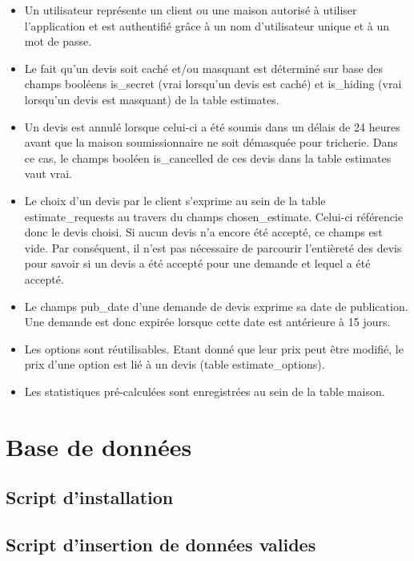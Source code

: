 \documentclass[11pt,a4paper]{report}
\begin{document}
\begin{itemize}\renewcommand{\labelitemi}{$\bullet$}
    \item Un utilisateur représente un client ou une maison autorisé à utiliser l’application et
    est authentifié grâce à un nom d’utilisateur unique et à un mot de passe.
    \item Le fait qu’un devis soit caché et/ou masquant est déterminé sur base des champs booléens is\_secret
    (vrai lorsqu’un devis est caché) et is\_hiding (vrai lorsqu’un devis est masquant) de la table estimates.
    \item Un devis est annulé lorsque celui-ci a été soumis dans un délais de 24 heures avant que la maison soumissionnaire ne soit démasquée pour tricherie. Dans ce cas, le champs booléen is\_cancelled de ces devis dans la table estimates vaut vrai.
    \item Le choix d’un devis par le client s’exprime au sein de la table estimate\_requests au travers du champs chosen\_estimate. Celui-ci référencie donc le devis choisi. Si aucun devis n’a encore été accepté, ce champs est vide. Par conséquent, il n’est pas nécessaire de parcourir l’entièreté des devis pour savoir si un devis a été accepté pour une demande et lequel a été accepté.
    \item Le champs pub\_date d’une demande de devis exprime sa date de publication. Une demande est donc expirée lorsque cette date est antérieure à 15 jours.
    \item Les options sont réutilisables. Etant donné que leur prix peut être modifié, le prix d'une option est lié à un devis (table estimate\_options).
    \item Les statistiques pré-calculées sont enregistrées au sein de la table maison.
\end{itemize}


\setlength{\parskip}{0pt}
\chapter{Base de données}

\section{Script d'installation}

\newpage

\section{Script d'insertion de données valides}

\newpage
\end{document}
